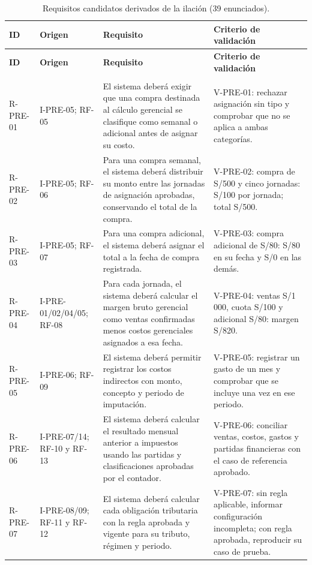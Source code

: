 {\small
\begin{longtable}{L{2.05cm} L{2.75cm} L{6.0cm} L{3.4cm}}
\caption{Requisitos candidatos derivados de la ilación (39 enunciados).}
\label{tab:derivados}\\
\toprule
\textbf{ID} & \textbf{Origen} & \textbf{Requisito} & \textbf{Criterio de validación} \\
\midrule
\endfirsthead
\toprule
\textbf{ID} & \textbf{Origen} & \textbf{Requisito} & \textbf{Criterio de validación} \\
\midrule
\endhead
\bottomrule
\endfoot
{} \\
R-PRE-01 & I-PRE-05; RF-05 & El sistema deberá exigir que una compra destinada al cálculo gerencial se clasifique como semanal o adicional antes de asignar su costo. & V-PRE-01: rechazar asignación sin tipo y comprobar que no se aplica a ambas categorías. \\
R-PRE-02 & I-PRE-05; RF-06 & Para una compra semanal, el sistema deberá distribuir su monto entre las jornadas de asignación aprobadas, conservando el total de la compra. & V-PRE-02: compra de S/500 y cinco jornadas: S/100 por jornada; total S/500. \\
R-PRE-03 & I-PRE-05; RF-07 & Para una compra adicional, el sistema deberá asignar el total a la fecha de compra registrada. & V-PRE-03: compra adicional de S/80: S/80 en su fecha y S/0 en las demás. \\
R-PRE-04 & I-PRE-01/02/04/05; RF-08 & Para cada jornada, el sistema deberá calcular el margen bruto gerencial como ventas confirmadas menos costos gerenciales asignados a esa fecha. & V-PRE-04: ventas S/1\,000, cuota S/100 y adicional S/80: margen S/820. \\
R-PRE-05 & I-PRE-06; RF-09 & El sistema deberá permitir registrar los costos indirectos con monto, concepto y periodo de imputación. & V-PRE-05: registrar un gasto de un mes y comprobar que se incluye una vez en ese periodo. \\
R-PRE-06 & I-PRE-07/14; RF-10 y RF-13 & El sistema deberá calcular el resultado mensual anterior a impuestos usando las partidas y clasificaciones aprobadas por el contador. & V-PRE-06: conciliar ventas, costos, gastos y partidas financieras con el caso de referencia aprobado. \\
R-PRE-07 & I-PRE-08/09; RF-11 y RF-12 & El sistema deberá calcular cada obligación tributaria con la regla aprobada y vigente para su tributo, régimen y periodo. & V-PRE-07: sin regla aplicable, informar configuración incompleta; con regla aprobada, reproducir su caso de prueba. \\

\end{longtable}}
